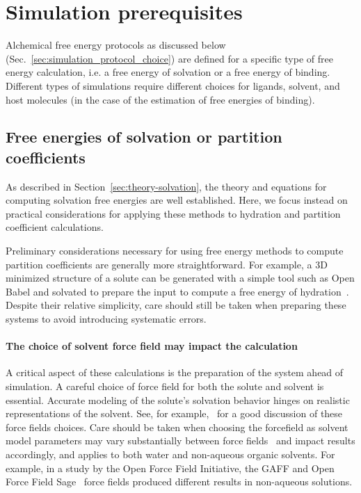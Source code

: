 \documentclass[9pt,bestpractices]{livecoms}
\begin{document}
\section{Simulation prerequisites}
\label{sec:prerequisites}
Alchemical free energy protocols as discussed below (Sec.~\ref{sec:simulation_protocol_choice}) are defined for a specific type of free energy calculation, i.e. a free energy of solvation or a free energy of binding. Different types of simulations require different choices for ligands, solvent, and host molecules (in the case of the estimation of free energies of binding). 

\subsection{Free energies of solvation or partition coefficients}
As described in Section~\ref{sec:theory-solvation}, the theory and equations for computing solvation free energies are well established. Here, we focus instead on practical considerations for applying these methods to hydration and partition coefficient calculations.

\label{subsec:hydration}
Preliminary considerations necessary for using free energy methods to compute partition coefficients are generally more straightforward. For example, a 3D minimized structure of a solute can be generated with a simple tool such as Open Babel and solvated to prepare the input to compute a free energy of hydration~\cite{oboyle2011open}. Despite their relative simplicity, care should still be taken when preparing these systems to avoid introducing systematic errors.

\paragraph{The choice of solvent force field may impact the calculation}
A critical aspect of these calculations is the preparation of the system ahead of simulation.  A careful choice of force field for both the solute and solvent is essential.  Accurate modeling of the solute's solvation behavior hinges on realistic representations of the solvent. See, for example,~\cite{bosisio2016blinded,rustenburg2016measuring} for a good discussion of these force fields choices.  Care should be taken when choosing the forcefield as solvent model parameters may vary substantially between force fields~\cite{jambeck2003, kadaoluwa_2021, mobley_2007charge} and impact results accordingly, and applies to both water and non-aqueous organic solvents. For example, in a study by the Open Force Field Initiative, the  GAFF\cite{wang2004gaff} and Open Force Field Sage~\cite{boothroyd2023sage} force fields produced different results in non-aqueous solutions. 
\end{document}
